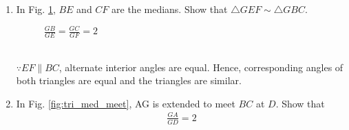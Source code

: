 %
\renewcommand{\theequation}{\theenumi}
\begin{enumerate}[label=\arabic*.,ref=\thesubsection.\theenumi]

\item	In Fig. \ref{fig:tri_med_centroid}, $BE$ and $CF$ are the medians. Show that $\triangle GEF \sim \triangle GBC$.
%
\begin{figure}[!ht]
	\begin{center}
		\resizebox{\columnwidth}{!}{}
	\end{center}
	\caption{$\frac{GB}{GE} = \frac{GC}{GF} = 2$}
	\label{fig:tri_med_centroid}	
\end{figure}
\\
\solution $\because EF \parallel BC$, alternate interior angles are equal.  Hence, corresponding angles of both triangles are equal and the triangles are similar.
\iffalse
\solution $\because \triangle GEF \sim \triangle GBC$ and $\frac{EF}{BC} =2$, \eqref{eq:tri_med_centroid_ratio} follows.
\fi
%
\item In Fig. \ref{fig:tri_med_meet}, AG is extended to meet $BC$ at $D$.	Show that 
	\begin{align}
\label{eq:tri_med_centroid_ratio_AD}
\frac{GA}{GD} = 2
	\end{align}


\end{enumerate}
